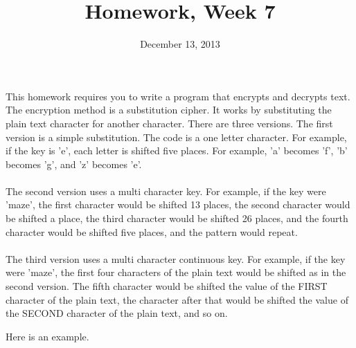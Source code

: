 \documentclass{article}
\title{Homework, Week 7}
\date{December 13, 2013}
\begin{document}
\maketitle{}

\paragraph{}This homework requires you to write a program that encrypts and decrypts text. The encryption method is a substitution cipher. It works by substituting the plain text character for another character. There are three versions. The first version is a simple substitution. The code is a one letter character. For example, if the key is 'e', each letter is shifted five places. For example, 'a' becomes 'f', 'b' becomes 'g', and 'z' becomes 'e'.

\paragraph{}The second version uses a multi character key. For example, if the key were 'maze', the first character would be shifted 13 places, the second character would be shifted a place, the third character would be shifted 26 places, and the fourth character would be shifted five places, and the pattern would repeat.

\paragraph{}The third version uses a multi character continuous key. For example, if the key were 'maze', the first four characters of the plain text would be shifted as in the second version. The fifth character would be shifted the value of the FIRST character of the plain text, the character after that would be shifted the value of the SECOND character of the plain text, and so on.

Here is an example.
\end{document}
